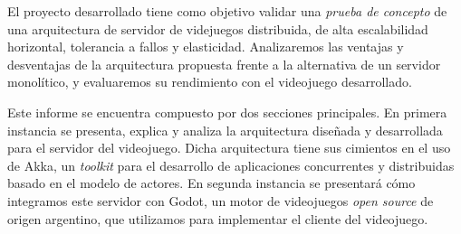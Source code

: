 \noindent El proyecto desarrollado tiene como objetivo validar una \textit{prueba de concepto} de
una arquitectura de servidor de videjuegos distribuida, de alta escalabilidad horizontal,
tolerancia a fallos y elasticidad. Analizaremos las ventajas y desventajas de la arquitectura
propuesta frente a la alternativa de un servidor monolítico, y evaluaremos su rendimiento
con el videojuego desarrollado.
 
Este informe se encuentra compuesto por dos secciones principales. En primera
instancia se presenta, explica y analiza la arquitectura diseñada y desarrollada para el
servidor del videojuego. Dicha arquitectura tiene sus cimientos en el uso de Akka, un 
\textit{toolkit} para el desarrollo de aplicaciones concurrentes y distribuidas basado
en el modelo de actores. En segunda instancia se presentará cómo integramos este servidor
con Godot, un motor de videojuegos \textit{open source} de origen argentino, que utilizamos
para implementar el cliente del videojuego.
